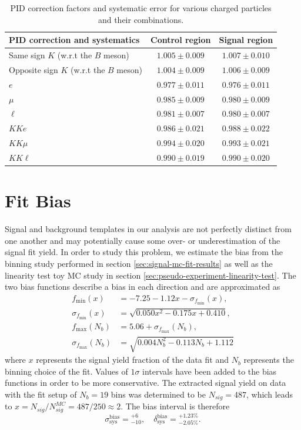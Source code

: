 \begin{table}[!htb]
	\centering
	\begin{tabular}{|l|c|c|}
		\hline
		PID correction and systematics & Control region & Signal region \\
		\hline
		Same sign $K$ (w.r.t the $B$ meson) & $1.005\pm 0.009$ & $1.007\pm 0.010$\\
		\hline
		Opposite sign $K$ (w.r.t the $B$ meson) & $1.004\pm 0.009$ & $1.006\pm 0.009$\\
		\hline
		$e$ & $0.977\pm 0.011$ & $0.976\pm 0.011$\\
		\hline
		$\mu$ & $0.985\pm 0.009$ & $0.980\pm 0.009$\\
		\hline
		$\ell$ & $0.981\pm 0.007$ & $0.980\pm 0.007$\\
		\hline
		\hline
		$KKe$ & $0.986 \pm 0.021$ & $0.988\pm 0.022$\\
		\hline
		$KK\mu$ & $0.994 \pm 0.020$ & $0.993\pm 0.021$\\
		\hline
		$KK\ell$ & $0.990 \pm 0.019$ & $0.990\pm 0.020$\\
		\hline
	\end{tabular}
	\caption{PID correction factors and systematic error for various charged particles and their combinations.}
	\label{tab:PID}
\end{table}

\section{Fit Bias}
Signal and background templates in our analysis are not perfectly distinct from one another and may potentially cause some over- or underestimation of the signal fit yield. In order to study this problem, we estimate the bias from the binning study performed in section \ref{sec:signal-mc-fit-results} as well as the linearity test toy MC study in section \ref{sec:pseudo-experiment-linearity-test}. The two bias functions describe a bias in each direction and are approximated as
\begin{align}
f_{\mathrm{min}}(x) &= -7.25-1.12x - \sigma_{f_{\mathrm{min}}}(x), \\
\sigma_{f_{\mathrm{min}}}(x) &= \sqrt{0.050 x^2 - 0.175 x + 0.410}, \\
f_{\mathrm{max}}(N_b) &= 5.06 + \sigma_{f_{\mathrm{max}}}(N_b), \\
\sigma_{f_{\mathrm{max}}}(N_b) &= \sqrt{0.004N_b^2 - 0.113 N_b + 1.112}
\end{align}
where $x$ represents the signal yield fraction of the data fit and $N_b$ represents the binning choice of the fit. Values of $1\sigma$ intervals have been added to the bias functions in order to be more conservative. The extracted signal yield on data  with the fit setup of $N_b=19$ bins was determined to be $N_{sig} = 487$, which leads to $x = N_{sig} / N_{sig}^{MC} = 487 / 250 \approx 2$. The bias interval is therefore
\begin{equation}
\sigma_{\mathrm{sys}}^{\mathrm{bias}} = {}^{+6}_{-10},\quad \delta_{\mathrm{sys}}^{\mathrm{bias}} = {}^{+1.23\%}_{-2.05\%}.
\end{equation}

